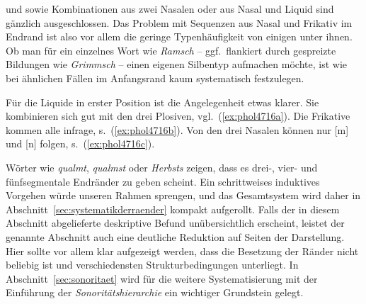 \begin{exe}
  \ex\label{ex:phol4715}
  \begin{xlist}
  \end{xlist}
\end{exe}

\textipa{[mf]} und \textipa{[Nf]} sowie Kombinationen aus zwei Nasalen oder aus Nasal und Liquid sind gänzlich ausgeschlossen.
Das Problem mit Sequenzen aus Nasal und Frikativ im Endrand ist also vor allem die geringe Typenhäufigkeit von einigen unter ihnen.
Ob man \zB für ein einzelnes Wort wie \textit{Ramsch} -- ggf.\ flankiert durch gespreizte Bildungen wie \textit{Grimmsch} -- einen eigenen Silbentyp aufmachen möchte, ist wie bei ähnlichen Fällen im Anfangsrand kaum systematisch festzulegen.

Für die Liquide in erster Position ist die Angelegenheit etwas klarer.
Sie kombinieren sich gut mit den drei Plosiven, vgl.\ (\ref{ex:phol4716a}).
Die Frikative kommen alle infrage, s.\ (\ref{ex:phol4716b}).
Von den drei Nasalen können nur [m] und [n] folgen, s.\ (\ref{ex:phol4716c}).

\begin{exe}
  \ex\label{ex:phol4716}
  \begin{xlist}
  \end{xlist}
\end{exe}

Wörter wie \textit{qualmt}, \textit{qualmst} oder \textit{Herbsts} zeigen, dass es drei-, vier- und fünfsegmentale Endränder zu geben scheint.
Ein schrittweises induktives Vorgehen würde unseren Rahmen sprengen, und das Gesamtsystem wird daher in Abschnitt~\ref{sec:systematikderraender} kompakt aufgerollt.
Falls der in diesem Abschnitt abgelieferte deskriptive Befund unübersichtlich erscheint, leistet der genannte Abschnitt auch eine deutliche Reduktion auf Seiten der Darstellung.
Hier sollte vor allem klar aufgezeigt werden, dass die Besetzung der Ränder nicht beliebig ist und verschiedensten Strukturbedingungen unterliegt.
In Abschnitt~\ref{sec:sonoritaet} wird für die weitere Systematisierung mit der Einführung der \textit{Sonoritätshierarchie} ein wichtiger Grundstein gelegt.


